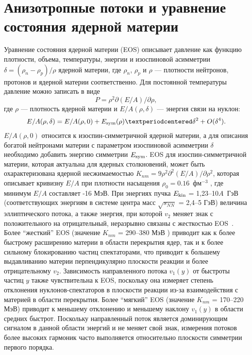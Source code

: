 \section{Анизотропные потоки и уравнение состояния ядерной материи}

Уравнение состояния ядерной материи (EOS) описывает давление как функцию плотности, объема, температуры, энергии и изоспиновой асимметрии $\delta = (\rho_n - \rho_p)/\rho$ ядерной материи, где $\rho_n$, $\rho_p$ и $\rho$ --- плотности нейтронов, протонов и ядерной материи соответственно.
Для постоянной температуры давление можно записать в виде
%
\begin{equation}
    P = \rho^2 \partial(E/A)/\partial\rho,
\end{equation}
%
где $\rho$ --- плотность ядерной материи и $E/A(\rho,\delta)$ --- энергия связи на нуклон:
\begin{equation}
    E/A(\rho,\delta) = E/A(\rho,0) + E_{\rm sym} (\rho)·\delta^2 + O(\delta^4).
\end{equation}
$E/A(\rho,0)$ относится к изоспин-симметричной ядерной материи, а для описания богатой нейтронами материи с параметром изоспиновой асимметрии $\delta$ необходимо добавить энергию симметрии $E_{\rm sym}$. 
EOS для изоспин-симметричной материи, которая актуальна для  ядерных столкновений, может быть охарактеризована ядерной несжимаемостью $K_{nm} = 9\rho^2\partial^2(E/A)/\partial\rho^2$, которая  описывает кривизну $E/A$ при плотности насыщения $\rho_0 = 0.16$~фм$^{-3}$ , где минимум $E/A$ составляет -16 МэВ.
При энергиях пучка  $E_{\rm kin}$ = 1,23--10$A$~ГэВ (соответствующих энергиям в системе центра масс $\sqrt{s_{NN}}$ = 2,4--5 ГэВ) величина эллиптического потока, а также энергия, при которой $v_2$ меняет знак с положительного на отрицательный, неразрывно связаны с жесткостью EOS~\cite{le2018origin, andronic2005excitation}.
Более ``жесткий'' EOS (значение $K_{nm}$ = 290--380 МэВ ) 
приводит как к более быстрому расширению материи в области перекрытия ядер, так и к более сильному
блокированию частиц спектаторами, что приводит к большему выдавливанию материи перпендикулярно плоскости реакции  и
более отрицательному $v_2$. 
Зависимость направленного потока $v_1(y)$ от быстроты частиц $y$ также чувствительна
к EOS, поскольку она измеряет степень отклонения нуклонов-спектаторов в плоскости реакции из-за
взаимодействия с материей в области перекрытия. 
Более ``мягкий'' EOS (значение $K_{nm}$ = 170--220 МэВ)
приводит к меньшему отклонению и меньшему наклону  $v_1(y)$ в области средних быстрот.
Поскольку направленный поток является доминирующим сигналом в данной области энергий и не меняет свой знак, измерения потоков более высоких
гармоник часто выполняется относительно плоскости симметрии первого порядка.

